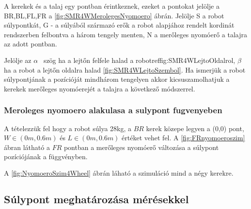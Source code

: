 A kerekek és a talaj egy pontban érintkeznek, ezeket a pontokat jelölje a BR,BL,FL,FR a \ref{fig:SMR4WMerolegesNyomoero} ábrán. Jelölje S a robot súlypontkát, G - a súlyából származó erők a robot alapjához rendelt kordinát rendszerben felbontva a három tengely menten, N a merőleges nyomóerő a talajra az adott pontban.

\renewcommand{\img}{SajatRobot/SzerkAbrak/MerolegesNyomoEro.jpg}
\renewcommand{\sources}{*}
\renewcommand{\captionn}{Merőleges nyomóerő a talajra $4W-SSMR$ típusú robot esetében.}
\renewcommand{\figlabel}{SMR4WMerolegesNyomoero}


Jelölje az $\alpha$ \ szög ha a lejtőn felfele halad a robotref{fig:SMR4WLejtoOldalrol}, $\beta$  ha a robot a lejtőn oldalra halad \ref{fig:SMR4WLejtoSzembol}. 
Ha ismerjük a robot súlypontjának a pozícióját mindhárom tengelyen akkor kicsuszamolhatjuk a kerekek merőleges nyomóerejét a talajra a következő módszerrel.



\renewcommand{\img}{SajatRobot/SzerkAbrak/LejtoOldalrol.jpg}
\renewcommand{\sources}{*}
\renewcommand{\captionn}{$4W-SSMR$ típusú robot lejtőn felfele oldal nézetből.}
\renewcommand{\aspectratioPic}{0.5}
\renewcommand{\figlabel}{SMR4WLejtoOldalrol}


\renewcommand{\img}{SajatRobot/SzerkAbrak/LejtoSzembol.png}
\renewcommand{\sources}{*}
\renewcommand{\captionn}{$4W-SSMR$ típusú robot lejtőn első nézetből.}
\renewcommand{\aspectratioPic}{0.5}
\renewcommand{\figlabel}{SMR4WLejtoSzembol}




\subsubsection{Meroleges nyomoero alakulasa a sulypont fugvenyeben}

A tételezzük fel hogy a robot súlya 28kg, a $BR$ kerek közepe legyen a (0,0) pont, $W\in(0m,0.6m)$ és $L\in(0m,0.6m)$ értéket vehet fel.
A \ref{fig:FRnyomoeroszim} ábran látható a $FR$ pontban a merőleges nyomóerő változása a súlypont pozíciójának a függvényben.



A \ref{fig:NyomoeroSzim4Wheel} ábrán láható a szimuláció mind a négy kerekre.

\subsection{Súlypont meghatározása mérésekkel}

